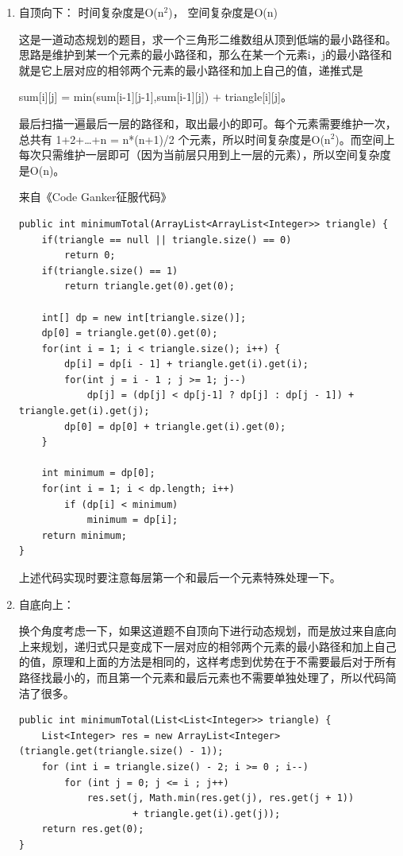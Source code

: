 \documentclass[12pt]{book}
\begin{document}
\begin{enumerate}
\item 自顶向下： 时间复杂度是O(n$^{\text{2}}$)， 空间复杂度是O(n)
\label{sec-14-2-9-1}

这是一道动态规划的题目，求一个三角形二维数组从顶到低端的最小路径和。思路是维护到某一个元素的最小路径和，那么在某一个元素i，j的最小路径和就是它上层对应的相邻两个元素的最小路径和加上自己的值，递推式是

sum[i][j] = min(sum[i-1][j-1],sum[i-1][j]) + triangle[i][j]。

最后扫描一遍最后一层的路径和，取出最小的即可。每个元素需要维护一次，总共有 1+2+\ldots{}+n = n*(n+1)/2 个元素，所以时间复杂度是O(n$^{\text{2}}$)。而空间上每次只需维护一层即可（因为当前层只用到上一层的元素），所以空间复杂度是O(n)。

来自《Code Ganker征服代码》
\lstset{language=java,label= ,caption= ,numbers=none}
\begin{lstlisting}
public int minimumTotal(ArrayList<ArrayList<Integer>> triangle) {  
    if(triangle == null || triangle.size() == 0)  
        return 0;  
    if(triangle.size() == 1)  
        return triangle.get(0).get(0);
    
    int[] dp = new int[triangle.size()];  
    dp[0] = triangle.get(0).get(0);  
    for(int i = 1; i < triangle.size(); i++) {  
        dp[i] = dp[i - 1] + triangle.get(i).get(i);  
        for(int j = i - 1 ; j >= 1; j--)  
            dp[j] = (dp[j] < dp[j-1] ? dp[j] : dp[j - 1]) + triangle.get(i).get(j);  
        dp[0] = dp[0] + triangle.get(i).get(0);  
    }
    
    int minimum = dp[0];  
    for(int i = 1; i < dp.length; i++) 
        if (dp[i] < minimum)
            minimum = dp[i];  
    return minimum;  
}
\end{lstlisting}

上述代码实现时要注意每层第一个和最后一个元素特殊处理一下。
\item 自底向上：
\label{sec-14-2-9-2}

换个角度考虑一下，如果这道题不自顶向下进行动态规划，而是放过来自底向上来规划，递归式只是变成下一层对应的相邻两个元素的最小路径和加上自己的值，原理和上面的方法是相同的，这样考虑到优势在于不需要最后对于所有路径找最小的，而且第一个元素和最后元素也不需要单独处理了，所以代码简洁了很多。
\lstset{language=java,label= ,caption= ,numbers=none}
\begin{lstlisting}
public int minimumTotal(List<List<Integer>> triangle) {
    List<Integer> res = new ArrayList<Integer>(triangle.get(triangle.size() - 1));
    for (int i = triangle.size() - 2; i >= 0 ; i--) 
        for (int j = 0; j <= i ; j++) 
            res.set(j, Math.min(res.get(j), res.get(j + 1))
                    + triangle.get(i).get(j));
    return res.get(0);
}
\end{lstlisting}
\end{enumerate}
\end{document}
